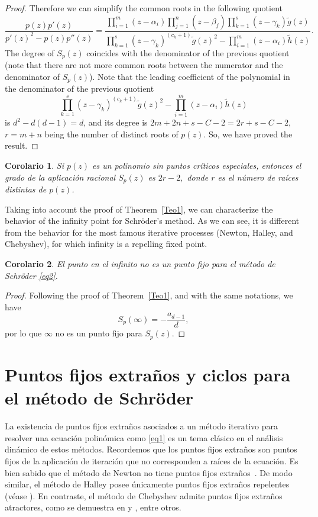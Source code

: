 \IfFileExists{aims.cls}{\documentclass{aims}}{\documentclass[11pt]{article}}
\numberwithin{equation}{section}
\theoremstyle{thmstyleone}%
\newtheorem{corollary}{Corolario}
\theoremstyle{thmstyletwo}%
\theoremstyle{thmstylethree}%
\begin{document}
\begin{proof}
Therefore we can simplify the common roots in the following quotient
$$
\frac{p(z)p'(z)}{p'(z)^2- p(z)p''(z)}=\dfrac{\prod_{i=1}^m(z-\alpha_i)\prod_{j=1}^n(z-\beta_j) \prod_{k=1}^s(z-\gamma_k) \tilde{g}(z)}
{\prod_{k=1}^s(z-\gamma_k)^{(c_k+1)} \tilde{g}(z)^2-\prod_{i=1}^m(z-\alpha_i)\tilde{h}(z)}.
$$
The degree of $S_p(z)$ coincides with the denominator of the previous quotient (note that there are not more common roots between the numerator and the denominator of $S_p(z)$). Note that the leading coefficient of the polynomial in the denominator of the previous quotient
$$
\prod_{k=1}^s(z-\gamma_k)^{(c_k+1)} \tilde{g}(z)^2-\prod_{i=1}^m(z-\alpha_i)\tilde{h}(z)
$$
is $d^2-d(d-1)=d$, and its degree is
$2m+2n+s-C-2 =2r+s-C-2$,  $r=m+n$ being the number of distinct roots of $p(z)$. So, we have proved the result.
\end{proof}

\begin{corollary}\label{Cor2}
Si $p(z)$ es un polinomio sin puntos críticos especiales, entonces el grado de la aplicación racional $S_{p}(z)$ es
$2r-2,$
donde $ r $ es el número de raíces distintas de $p(z)$.
\end{corollary}

Taking into account the proof of Theorem~\ref{Teo1}, we can characterize the behavior of the infinity point for Schr\"oder's method. As we can see, it is different from the behavior for the most famous iterative processes (Newton, Halley, and Chebyshev), for which infinity is a repelling fixed point. 

\begin{corollary}\label{Cor1}
El punto en el infinito no es un punto fijo para el método de Schröder \eqref{eq2}.
\end{corollary}
\begin{proof}
Following the proof of Theorem~\ref{Teo1}, and with the same notations, we have
$$
S_p(\infty)=-\frac{a_{d-1}}{d},
$$
por lo que $\infty$ no es un punto fijo para $S_p(z)$.
\end{proof}
\section{Puntos fijos extraños y ciclos para el método de Schr\"oder} \label{section3}

La existencia de puntos fijos extraños asociados a un método iterativo para resolver una ecuación polinómica como \eqref{eq1} es un tema clásico en el análisis dinámico de estos métodos. Recordemos que los puntos fijos extraños son puntos fijos de la aplicación de iteración que no corresponden a raíces de la ecuación. Es bien sabido que el método de Newton no tiene puntos fijos extraños~\cite{3Traub}. De modo similar, el método de Halley posee únicamente puntos fijos extraños repelentes (véase \cite{9Kneisl}). En contraste, el método de Chebyshev admite puntos fijos extraños atractores, como se demuestra en \cite{5GV} y \cite{10Vrscay}, entre otros.
\end{document}

